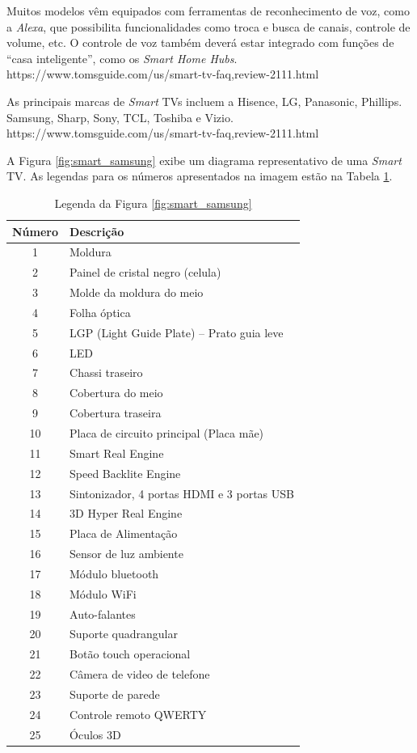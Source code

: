 Muitos modelos vêm equipados com ferramentas de reconhecimento de voz, como a \emph{Alexa}, que possibilita funcionalidades como troca e busca de canais, controle de volume, etc. O controle de voz também deverá estar integrado com funções de ``casa inteligente'', como os \emph{Smart Home Hubs}. https://www.tomsguide.com/us/smart-tv-faq,review-2111.html

As principais marcas de \emph{Smart} TVs incluem a Hisence, LG, Panasonic, Phillips. Samsung, Sharp, Sony, TCL, Toshiba e Vizio. https://www.tomsguide.com/us/smart-tv-faq,review-2111.html

A Figura \ref{fig:smart_samsung} exibe um diagrama representativo de uma \emph{Smart} TV. As legendas para os números apresentados na imagem estão na Tabela \ref{tab:smart}.

\begin{table}[t]
	\centering
	\caption{Legenda da Figura \ref{fig:smart_samsung}}
	\label{tab:smart}
	\begin{tabular}{c l}
		\hline
		Número & Descrição \\
		\hline
		1 & Moldura \\
		2 & Painel de cristal negro (celula) \\
		3 & Molde da moldura do meio \\
		4 & Folha óptica \\
		5 & LGP (Light Guide Plate) -- Prato guia leve \\
		6 & LED \\
		7 & Chassi traseiro \\
		8 & Cobertura do meio \\
		9 & Cobertura traseira \\
		10 & Placa de circuito principal (Placa mãe) \\
		11 & Smart Real Engine \\
		12 & Speed Backlite Engine \\
		13 & Sintonizador, 4 portas HDMI e 3 portas USB \\
		14 & 3D Hyper Real Engine \\
		15 & Placa de Alimentação \\
		16 & Sensor de luz ambiente \\
		17 & Módulo bluetooth \\
		18 & Módulo WiFi \\
		19 & Auto-falantes \\
		20 & Suporte quadrangular \\
		21 & Botão touch operacional \\
		22 & Câmera de video de telefone \\
		23 & Suporte de parede \\
		24 & Controle remoto QWERTY \\
		25 & Óculos 3D \\
		\hline
	\end{tabular}
\end{table}
